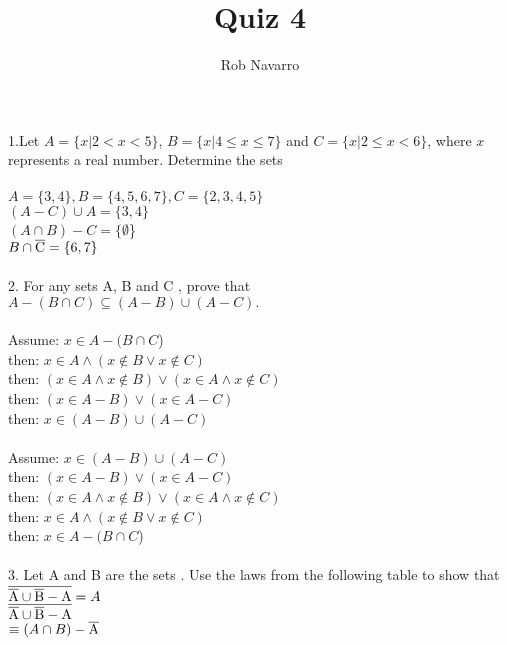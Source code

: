 \documentclass[11pt, oneside]{article}   	%
\title{Quiz 4}
\author{Rob Navarro}
\begin{document}
\maketitle
\noindent
1.Let $A = \{x | 2 < x <  5\}$, $B = \{x | 4\leq x\leq 7\}$ and $C = \{x | 2\leq x < 6\}$, where $x$ represents a real number. Determine the sets \\\\
$A = \{3, 4\}, B = \{4, 5, 6, 7\}, C = \{2, 3, 4, 5\}$\\
$(A - C)\cup A = \{3, 4\}$\\
$(A\cap B) - C = \{\emptyset$\}\\
$B\cap\overline{\rm C} = \{6, 7\}$\\\\
2. For any sets A, B and C , prove that\\
$ A-(B\cap C)\subseteq(A - B)\cup(A - C).$\\\\
Assume: $x\in A - (B\cap C$)\\
then: $x\in A\land (x\notin B\lor x\notin C)$\\
then: $(x\in A\land x\notin B)\lor (x\in A\land x\notin C)$\\
then: $(x\in A - B)\lor (x\in A - C)$\\
then: $x\in (A - B)\cup (A - C)$\\\\
Assume: $x\in (A - B)\cup (A - C)$\\
then: $(x\in A - B)\lor (x\in A - C)$\\
then: $(x\in A\land x\notin B)\lor (x\in A\land x\notin C)$\\
then: $x\in A\land (x\notin B\lor x\notin C)$\\
then: $x\in A - (B\cap C$)\\\\
3. Let A and B are the sets . Use the laws from the following table to show that \\
$\overline{\rm \overline{\rm A}\cup\overline{\rm B} - A} = A$\\
$\overline{\rm \overline{\rm A}\cup\overline{\rm B} - A} $\\
$\equiv (A\cap B) - \overline{\rm A}$\\
\end{document}
